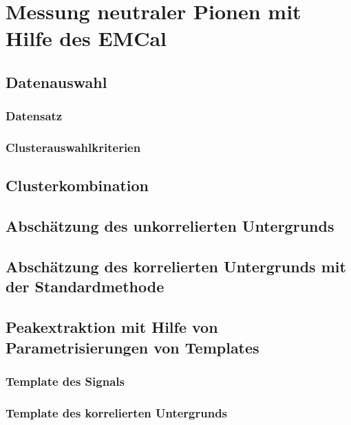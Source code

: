 \documentclass[a4paper,11pt,twoside]{report}
\renewcommand{\,}{,\!} %
\begin{document}
\chapter{Messung neutraler Pionen mit Hilfe des EMCal} \label{s3}

\section{Datenauswahl} \label{s3s1}

\subsection{Datensatz} \label{s3s1s1}


\subsection{Clusterauswahlkriterien} \label{s3s1s2}


\section{Clusterkombination} \label{s3s2}


\section{Absch{\"a}tzung des unkorrelierten Untergrunds} \label{s3s3}


\section{Absch{\"a}tzung des korrelierten Untergrunds mit der Standardmethode} \label{s3s4}


\section{Peakextraktion mit Hilfe von Parametrisierungen von Templates} \label{s3s5}


\subsection{Template des Signals} \label{s3s5s1}


\subsection{Template des korrelierten Untergrunds} \label{s3s5s2}

\end{document}
